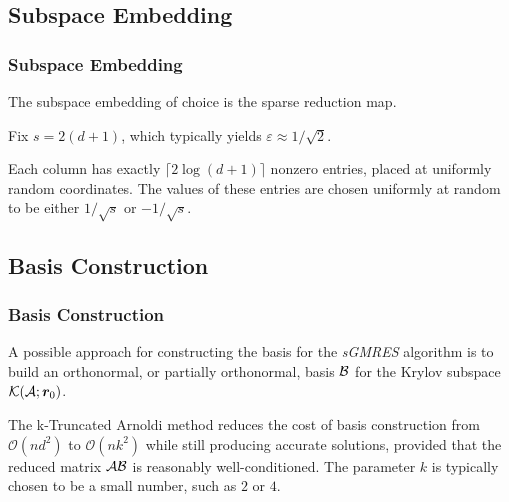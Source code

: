 \subsection{Subspace Embedding}

\begin{frame}
    \frametitle{Subspace Embedding}

    The subspace embedding of choice is the sparse reduction map. 
    
    Fix $s = 2 \left( d + 1 \right)$, which typically yields $\varepsilon \approx 1 / \sqrt{2}$.
    
    Each column has exactly $\lceil 2 \log \left( d + 1 \right) \rceil$ nonzero entries, placed at uniformly random coordinates. The values of these entries are chosen uniformly at random to be either $1 / \sqrt{s}$ or $-1 / \sqrt{s}$.
\end{frame}








\subsection{Basis Construction}

\begin{frame}
    \frametitle{Basis Construction}

    A possible approach for constructing the basis for the \textit{sGMRES} algorithm is to build an orthonormal, or partially orthonormal, basis $\mathcal{B}$ for the Krylov subspace $\mathcal{K}(\mathcal{A}; \bm{r}_0)$.

    The k-Truncated Arnoldi method reduces the cost of basis construction from $\mathcal{O}(n d^2)$ to $\mathcal{O}(n k^2)$ while still producing accurate solutions, provided that the reduced matrix $\mathcal{A} \mathcal{B}$ is reasonably well-conditioned. The parameter $k$ is typically chosen to be a small number, such as $2$ or $4$.
\end{frame}

